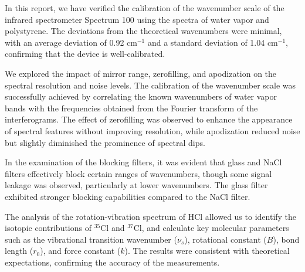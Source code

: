 \documentclass{article}
\begin{document}
In this report, we have verified the calibration of the wavenumber scale of the infrared spectrometer Spectrum 100 using the spectra of water vapor and polystyrene. The deviations from the theoretical wavenumbers were minimal, with an average deviation of 0.92 cm$^{-1}$ and a standard deviation of 1.04 cm$^{-1}$, confirming that the device is well-calibrated.

We explored the impact of mirror range, zerofilling, and apodization on the spectral resolution and noise levels. The calibration of the wavenumber scale was successfully achieved by correlating the known wavenumbers of water vapor bands with the frequencies obtained from the Fourier transform of the interferograms. The effect of zerofilling was observed to enhance the appearance of spectral features without improving resolution, while apodization reduced noise but slightly diminished the prominence of spectral dips.

In the examination of the blocking filters, it was evident that glass and NaCl filters effectively block certain ranges of wavenumbers, though some signal leakage was observed, particularly at lower wavenumbers. The glass filter exhibited stronger blocking capabilities compared to the NaCl filter.

The analysis of the rotation-vibration spectrum of HCl allowed us to identify the isotopic contributions of $^{35}$Cl and $^{37}$Cl, and calculate key molecular parameters such as the vibrational transition wavenumber ($\nu_s$), rotational constant ($B$), bond length ($r_0$), and force constant ($k$). The results were consistent with theoretical expectations, confirming the accuracy of the measurements.

\pagebreak{}
\end{document}
